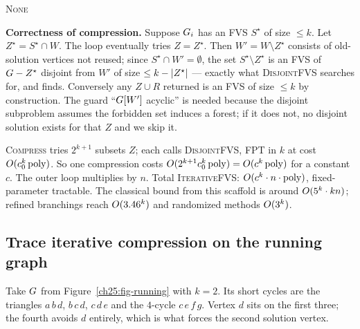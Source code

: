 \begin{algorithm}[H]
\caption{\textsc{Compress}$(\Gph,W,k)$ --- shrink an FVS by guessing its overlap}
\label{ch25:alg-compress}
\DontPrintSemicolon
{}
\Return \textsc{None}\;
\end{algorithm}

\begin{whybox}
\textbf{Correctness of compression.} Suppose $G_i$ has an FVS $S^\star$ of size $\le k$. Let $Z^\star = S^\star\cap W$. The loop eventually tries $Z=Z^\star$. Then $W' = W\setminus Z^\star$ consists of old-solution vertices not reused; since $S^\star\cap W' = \emptyset$, the set $S^\star\setminus Z^\star$ is an FVS of $G - Z^\star$ disjoint from $W'$ of size $\le k-\lvert Z^\star\rvert$ --- exactly what \textsc{DisjointFVS} searches for, and finds. Conversely any $Z\cup R$ returned is an FVS of size $\le k$ by construction. The guard ``$G[W']$ acyclic'' is needed because the disjoint subproblem assumes the forbidden set induces a forest; if it does not, no disjoint solution exists for that $Z$ and we skip it.
\end{whybox}

\begin{complexitybox}
\textsc{Compress} tries $2^{k+1}$ subsets $Z$; each calls \textsc{DisjointFVS}, FPT in $k$ at cost $O(c_0^{k}\operatorname{poly})$. So one compression costs $O(2^{k+1}c_0^{k}\operatorname{poly})=O(c^k\operatorname{poly})$ for a constant $c$. The outer loop multiplies by $n$. Total \textsc{IterativeFVS}: $O(c^{k}\cdot n\cdot\operatorname{poly})$, fixed-parameter tractable. The classical bound from this scaffold is around $O(5^k\cdot kn)$; refined branchings reach $O(3.46^k)$ and randomized methods $O(3^k)$.
\end{complexitybox}

\subsection{Trace iterative compression on the running graph}

Take $G$ from Figure~\ref{ch25:fig-running} with $k=2$. Its short cycles are the triangles $a\,b\,d$, $b\,c\,d$, $c\,d\,e$ and the $4$-cycle $c\,e\,f\,g$. Vertex $d$ sits on the first three; the fourth avoids $d$ entirely, which is what forces the second solution vertex.

